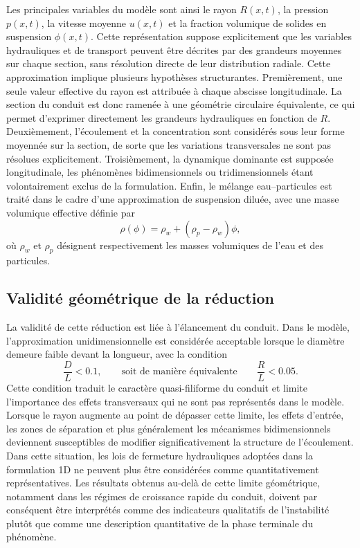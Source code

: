 \documentclass[11pt,a4paper]{report}
\begin{document}
Les principales variables du modèle sont ainsi le rayon \(R(x,t)\), la pression \(p(x,t)\), la vitesse
moyenne \(u(x,t)\) et la fraction volumique de solides en suspension \(\phi(x,t)\). Cette représentation
suppose explicitement que les variables hydrauliques et de transport peuvent être décrites par des
grandeurs moyennes sur chaque section, sans résolution directe de leur distribution radiale. Cette
approximation implique plusieurs hypothèses structurantes. Premièrement, une seule valeur effective du
rayon est attribuée à chaque abscisse longitudinale. La section du conduit est donc ramenée à une
géométrie circulaire équivalente, ce qui permet d'exprimer directement les grandeurs hydrauliques en
fonction de \(R\). Deuxièmement, l'écoulement et la concentration sont considérés sous leur forme
moyennée sur la section, de sorte que les variations transversales ne sont pas résolues explicitement.
Troisièmement, la dynamique dominante est supposée longitudinale, les phénomènes bidimensionnels ou
tridimensionnels étant volontairement exclus de la formulation. Enfin, le mélange eau--particules est
traité dans le cadre d'une approximation de suspension diluée, avec une masse volumique effective
définie par
\begin{equation}
\rho(\phi) = \rho_w + (\rho_p - \rho_w)\phi,
\label{eq:rho-mix}
\end{equation}
où \(\rho_w\) et \(\rho_p\) désignent respectivement les masses volumiques de l'eau et des particules.

\subsection{Validité géométrique de la réduction}

La validité de cette réduction est liée à l'élancement du conduit. Dans le modèle, l'approximation
unidimensionnelle est considérée acceptable lorsque le diamètre demeure faible devant la longueur, avec
la condition
\begin{equation}
\frac{D}{L} < 0.1,
\qquad\text{soit de manière équivalente}\qquad
\frac{R}{L} < 0.05 .
\label{eq:validite-1D}
\end{equation}
Cette condition traduit le caractère quasi-filiforme du conduit et limite l'importance des effets
transversaux qui ne sont pas représentés dans le modèle. Lorsque le rayon augmente au point de dépasser
cette limite, les effets d'entrée, les zones de séparation et plus généralement les mécanismes
bidimensionnels deviennent susceptibles de modifier significativement la structure de l'écoulement. Dans
cette situation, les lois de fermeture hydrauliques adoptées dans la formulation 1D ne peuvent plus être
considérées comme quantitativement représentatives. Les résultats obtenus au-delà de cette limite
géométrique, notamment dans les régimes de croissance rapide du conduit, doivent par conséquent être
interprétés comme des indicateurs qualitatifs de l'instabilité plutôt que comme une description
quantitative de la phase terminale du phénomène.
\end{document}
